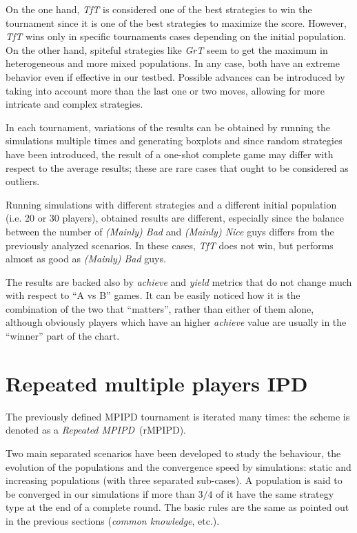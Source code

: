 \documentclass[journal,10pt,twoside]{IEEEtran}
\begin{document}
On the one hand, \textit{TfT} is considered one of the best strategies to win the tournament since it is one of the best strategies to maximize the score. However, \textit{TfT} wins only in specific tournaments cases depending on the initial population. On the other hand, spiteful strategies like \textit{GrT} seem to get the maximum in heterogeneous and more mixed populations. In any case, both have an extreme behavior even if effective in our testbed. Possible advances can be introduced by taking into account more than the last one or two moves, allowing for more intricate and complex strategies.~\cite{mathieu2017}

In each tournament, variations of the results can be obtained by running the simulations multiple times and generating boxplots and since random strategies have been introduced, the result of a one-shot complete game may differ with respect to the average results; these are rare cases that ought to be considered as outliers.

Running simulations with different strategies and a different initial population (i.e. 20 or 30 players), obtained results are different, especially since the balance between the number of \textit{(Mainly) Bad} and \textit{(Mainly) Nice} guys differs from the previously analyzed scenarios. In these cases, \textit{TfT} does not win, but performs almost as good as \textit{(Mainly) Bad} guys.

The results are backed also by \textit{achieve} and \textit{yield} metrics that do not change much with respect to ``A vs B'' games.
It can be easily noticed how it is the combination of the two that ``matters'', rather than either of them alone, although obviously players which have an higher \textit{achieve} value are usually in the ``winner'' part of the chart.

\section{Repeated multiple players IPD} \label{s:rIPDMP}
The previously defined MPIPD tournament is iterated many times: the scheme is denoted as a \textit{Repeated MPIPD}~(rMPIPD).

Two main separated scenarios have been developed to study the behaviour, the evolution of the populations and the convergence speed by simulations: static and increasing populations (with three separated sub-cases). A population is said to be converged in our simulations if more than $3/4$ of it have the same strategy type at the end of a complete round. The basic rules are the same as pointed out in the previous sections (\textit{common knowledge},  etc.).
\end{document}
